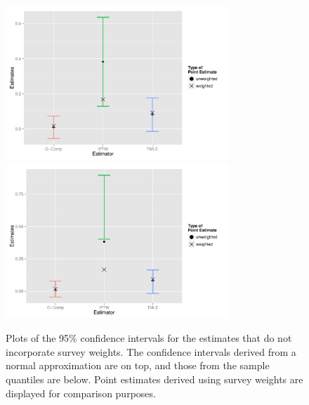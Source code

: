 \documentclass{article}
\begin{document}
\begin{figure}
\centering
\includegraphics[width=0.75\textwidth]{figures/naiveBootstrapNormalCI.pdf}
\includegraphics[width=0.75\textwidth]{figures/naiveBootstrapQuantileCI.pdf}
\caption{Plots of the 95\% confidence intervals for the estimates that do not incorporate survey weights. The confidence intervals derived from a normal approximation are on top, and those from the sample quantiles are below. Point estimates derived using survey weights are displayed for comparison purposes.}
\label{fig:cis}
\end{figure}
\end{document}
